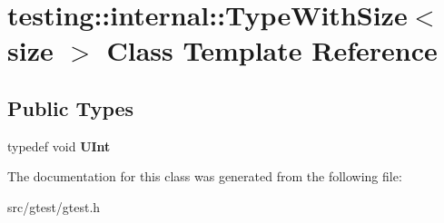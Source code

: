 \hypertarget{classtesting_1_1internal_1_1_type_with_size}{}\section{testing\+:\+:internal\+:\+:Type\+With\+Size$<$ size $>$ Class Template Reference}
\label{classtesting_1_1internal_1_1_type_with_size}
\subsection*{Public Types}
\begin{DoxyCompactItemize}
\item 
\mbox{\label{classtesting_1_1internal_1_1_type_with_size_a3898640d9f6c1e18110eef90f47a5d7b}} 
typedef void {\bfseries U\+Int}
\end{DoxyCompactItemize}


The documentation for this class was generated from the following file\+:\begin{DoxyCompactItemize}
\item 
src/gtest/gtest.\+h\end{DoxyCompactItemize}
